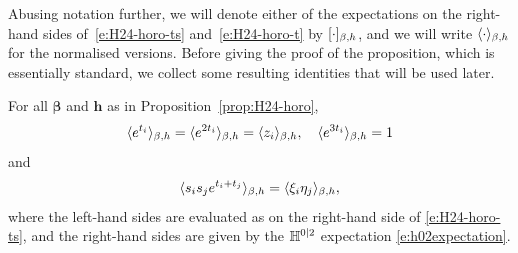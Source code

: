 \documentclass[11pt]{amsart}
\numberwithin{equation}{section}
\numberwithin{theorem}{section}
\newcommand{\V}[1]{\boldsymbol{#1}}
\begin{document}
Abusing notation further, we will denote either of the expectations on
the right-hand sides of~\eqref{e:H24-horo-ts} and~\eqref{e:H24-horo-t}
by $[{\cdot}]_{\beta,h}$, and we will write
$\langle \cdot \rangle_{\beta,h}$ for the normalised versions. Before giving the
proof of the proposition, which is essentially standard, we collect
some resulting identities that will be used later.

\begin{corollary}
  \label{cor:et}
  For all $\V{\beta}$ and $\V{h}$ as in Proposition~\ref{prop:H24-horo},
  \begin{equation}
    \label{e:et}
    \langle e^{t_i} \rangle _{\beta,h} =     \langle e^{2t_i} \rangle_{\beta,h} =
    \langle z_i \rangle_{\beta,h}, \quad     \langle e^{3t_i} \rangle_{\beta,h}=1
  \end{equation}
  and
  \begin{equation}  \label{e:xieta}
    \langle s_is_je^{t_i+t_j} \rangle_{\beta,h}
    = \langle \xi_i\eta_j \rangle_{\beta,h},
  \end{equation}
  where the left-hand sides are evaluated as on the right-hand side of
  \eqref{e:H24-horo-ts}, and the right-hand sides are given by the
  $\mathbb{H}^{0|2}$ expectation \eqref{e:h02expectation}.
\end{corollary}
\end{document}
